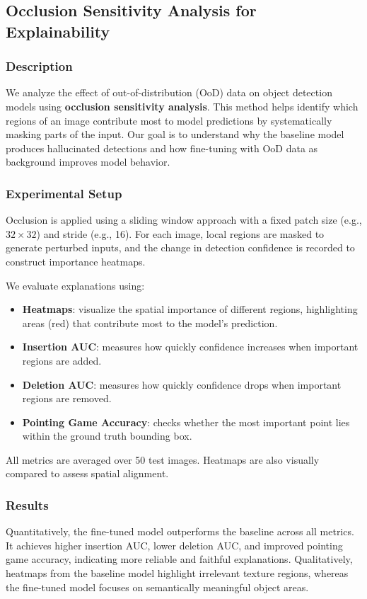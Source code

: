 \subsection{Occlusion Sensitivity Analysis for Explainability}

\subsubsection{Description}
We analyze the effect of out-of-distribution (OoD) data on object detection models using \textbf{occlusion sensitivity analysis}. This method helps identify which regions of an image contribute most to model predictions by systematically masking parts of the input. Our goal is to understand why the baseline model produces hallucinated detections and how fine-tuning with OoD data as background improves model behavior.

\subsubsection{Experimental Setup}
Occlusion is applied using a sliding window approach with a fixed patch size (e.g., $32 \times 32$) and stride (e.g., 16). For each image, local regions are masked to generate perturbed inputs, and the change in detection confidence is recorded to construct importance heatmaps.

We evaluate explanations using:
\begin{itemize}
    \item \textbf{Heatmaps}: visualize the spatial importance of different regions, highlighting areas (red) that contribute most to the model's prediction.
    \item \textbf{Insertion AUC}: measures how quickly confidence increases when important regions are added.
    \item \textbf{Deletion AUC}: measures how quickly confidence drops when important regions are removed.
    \item \textbf{Pointing Game Accuracy}: checks whether the most important point lies within the ground truth bounding box.
\end{itemize}

All metrics are averaged over 50 test images. Heatmaps are also visually compared to assess spatial alignment.

\subsubsection{Results}
Quantitatively, the fine-tuned model outperforms the baseline across all metrics. It achieves higher insertion AUC, lower deletion AUC, and improved pointing game accuracy, indicating more reliable and faithful explanations. Qualitatively, heatmaps from the baseline model highlight irrelevant texture regions, whereas the fine-tuned model focuses on semantically meaningful object areas.

